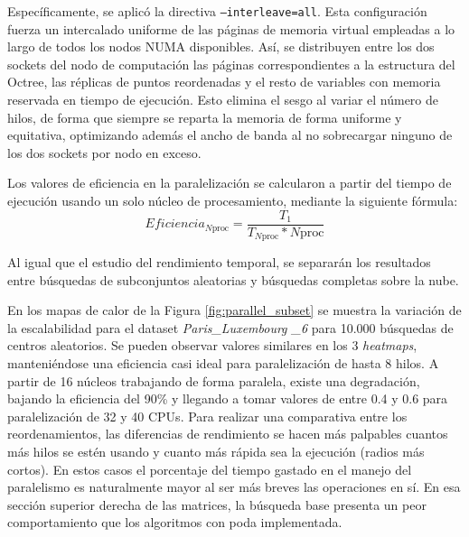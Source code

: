 Específicamente, se aplicó la directiva \texttt{--interleave=all}. Esta configuración fuerza un intercalado uniforme de las páginas de memoria virtual empleadas a lo largo de todos los nodos NUMA disponibles. Así, se distribuyen entre los dos sockets del nodo de computación las páginas correspondientes a la estructura del Octree, las réplicas de puntos reordenadas y el resto de variables con memoria reservada en tiempo de ejecución. Esto elimina el sesgo al variar el número de hilos, de forma que siempre se reparta la memoria de forma uniforme y equitativa, optimizando además el ancho de banda al no sobrecargar ninguno de los dos sockets por nodo en exceso.

Los valores de eficiencia en la paralelización se calcularon a partir del tiempo de ejecución usando un solo núcleo de procesamiento, mediante la siguiente fórmula: 
\begin{equation}
    Eficiencia_{N\text{proc}} = \frac{T_1}{T_{N\text{proc}} * N\text{proc}}
\end{equation}

Al igual que el estudio del rendimiento temporal, se separarán los resultados entre búsquedas de subconjuntos aleatorias y búsquedas completas sobre la nube.

En los mapas de calor de la Figura \ref{fig:parallel_subset} se muestra la variación de la escalabilidad para el dataset \textit{Paris\_Luxembourg \_6} para 10.000 búsquedas de centros aleatorios. Se pueden observar valores similares en los 3 \textit{heatmaps}, manteniéndose una eficiencia casi ideal para paralelización de hasta 8 hilos. A partir de 16 núcleos trabajando de forma paralela, existe una degradación, bajando la eficiencia del 90\% y llegando a tomar valores de entre 0.4 y 0.6 para paralelización de 32 y 40 CPUs. Para realizar una comparativa entre los reordenamientos, las diferencias de rendimiento se hacen más palpables cuantos más hilos se estén usando y cuanto más rápida sea la ejecución (radios más cortos). En estos casos el porcentaje del tiempo gastado en el manejo del paralelismo es naturalmente mayor al ser más breves las operaciones en sí. En esa sección superior derecha de las matrices, la búsqueda base presenta un peor comportamiento que los algoritmos con poda implementada.

